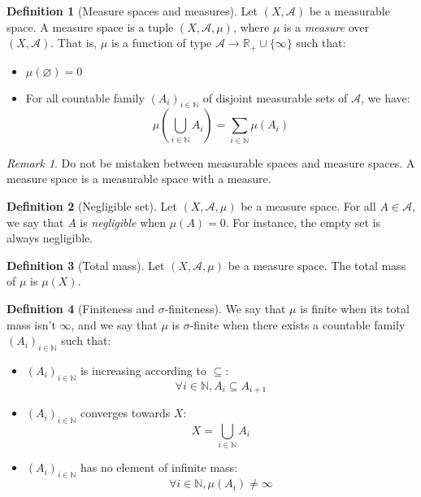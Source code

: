 \documentclass{article}
\theoremstyle{definition}
\newtheorem{definition}{Definition}[section]
\theoremstyle{remark}
\newtheorem*{remark}{Remark}
\theoremstyle{example}
\begin{document}
\begin{definition}[Measure spaces and measures]
    Let $(X, \mathcal{A})$ be a measurable space. A measure space is a tuple $(X, \mathcal{A}, \mu)$, where $\mu$ is a \textit{measure} over $(X, \mathcal{A})$. That is, $\mu$ is a function of type $\mathcal{A} \rightarrow \mathbb{R}_+ \cup \{\infty\}$ such that:
    \begin{itemize}
        \item $\mu(\varnothing) = 0$
        \item For all countable family $(A_i)_{i \in \mathbb{N}}$ of disjoint measurable sets of $\mathcal{A}$, we have:
            $$\mu(\bigcup_{i \in \mathbb{N}} A_i) = \sum_{i \in \mathbb{N}} \mu(A_i)$$
    \end{itemize}
\end{definition}

\begin{remark}
    Do not be mistaken between measurable spaces and measure spaces. A measure space is a measurable space with a measure.
\end{remark}

\begin{definition}[Negligible set]
    Let $(X, \mathcal{A}, \mu)$ be a measure space. For all $A \in \mathcal{A}$, we say that $A$ is \textit{negligible} when $\mu(A) = 0$. For instance, the empty set is always negligible.
\end{definition}

\begin{definition}[Total mass]
    Let $(X, \mathcal{A}, \mu)$ be a measure space. The total mass of $\mu$ is $\mu(X)$.
\end{definition}

\begin{definition}[Finiteness and $\sigma$-finiteness]
    We say that $\mu$ is finite when its total mass isn't $\infty$, and we say that $\mu$ is $\sigma$-finite when there exists a countable family $(A_i)_{i \in \mathbb{N}}$ such that:
    \begin{itemize}
        \item $(A_i)_{i \in \mathbb{N}}$ is increasing according to $\subseteq$:
            $$\forall i \in \mathbb{N}, A_i \subseteq A_{i+1}$$
        \item $(A_i)_{i \in \mathbb{N}}$ converges towards $X$:
            $$X = \bigcup_{i \in \mathbb{N}} A_i$$
        \item $(A_i)_{i \in \mathbb{N}}$ has no element of infinite mass:
            $$\forall i \in \mathbb{N}, \mu(A_i) \neq \infty$$
    \end{itemize}
\end{definition}
\end{document}
